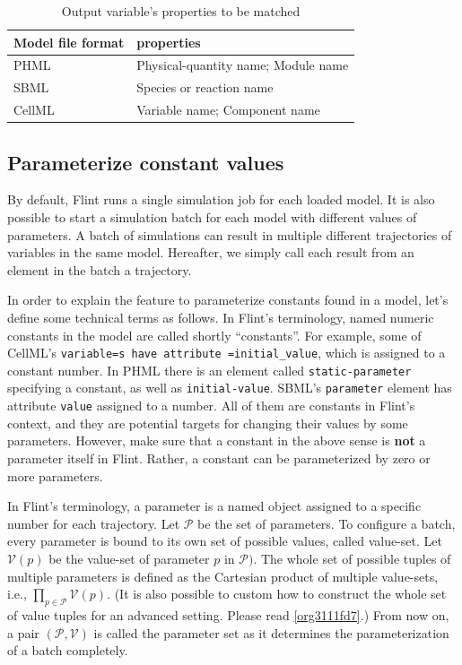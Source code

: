 \documentclass[a4paper,10pt]{report}
\begin{document}
\begin{table}[htbp]
\caption{\label{tab:orge4c894f}Output variable's properties to be matched}
\centering
\begin{tabular}{ll}
Model file format & properties\\
\hline
PHML & Physical-quantity name; Module name\\
SBML & Species or reaction name\\
CellML & Variable name; Component name\\
\end{tabular}
\end{table}

\subsection{Parameterize constant values}
\label{sec:orge1b2a85}
By default, Flint runs a single simulation job for each loaded model.
It is also possible to start a simulation batch for each model with
different values of parameters.
A batch of simulations can result in multiple different trajectories of
variables in the same model. Hereafter, we simply call each result from
an element in the batch a trajectory.

In order to explain the feature to parameterize constants found in a model,
let's define some technical terms as follows.
In Flint's terminology, named numeric constants in the model are called
shortly ``constants''.
For example, some of CellML's \texttt{variable=s have attribute
=initial\_value}, which is assigned to a constant number.
In PHML there is an element called \texttt{static-parameter} specifying a constant,
as well as \texttt{initial-value}.
SBML's \texttt{parameter} element has attribute \texttt{value} assigned to a number.
All of them are constants in Flint's context, and they are potential targets for
changing their values by some parameters.
However, make sure that a constant in the above sense is \textbf{not} a parameter
itself in Flint.
Rather, a constant can be parameterized by zero or more parameters.

In Flint's terminology, a parameter is a named object assigned to a specific
number for each trajectory.
Let \(\mathcal{P}\) be the set of parameters.
To configure a batch, every parameter is bound to its own set of possible
values, called value-set.
Let \(\mathcal{V}(p)\) be the value-set of parameter \(p\) in \(\mathcal{P})\).
The whole set of possible tuples of multiple parameters is defined as the
Cartesian product of multiple value-sets, i.e., \(\prod_{p \in \mathcal{P}}
\mathcal{V}(p)\).
(It is also possible to custom how to construct the whole set of value tuples
for an advanced setting. Please read \ref{org3111fd7}.)
From now on, a pair \((\mathcal{P}, \mathcal{V})\) is called the parameter set as
it determines the parameterization of a batch completely.
\end{document}
